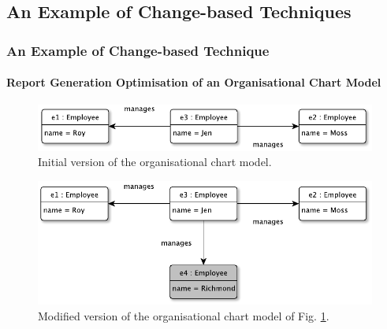 \documentclass{beamer}
\begin{document}
\begin{frame}
\section{An Example of Change-based Techniques}
\frametitle{An Example of Change-based Technique}
\label{sec:An example_of_change-based_techniques_1}
\framesubtitle{Report Generation Optimisation of an Organisational Chart Model}
\begin{figure}[ht]
\centering
\includegraphics[width=\linewidth]{initial_chart}
\caption{Initial version of the organisational chart model.}
\label{fig:initial_chart}
\end{figure}

\begin{figure}[ht]
\centering
\includegraphics[width=\linewidth]{modified_chart}
\caption{Modified version of the organisational chart model of Fig. \ref{fig:initial_chart}.}
\label{fig:modified_chart}
\end{figure}
\end{frame}
\end{document}
